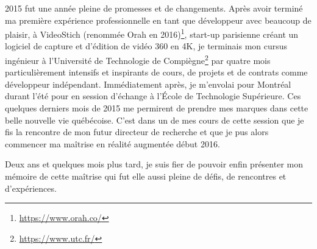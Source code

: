 2015 fut une année pleine de promesses et de changements. Après avoir terminé ma première expérience professionnelle en tant que développeur avec beaucoup de plaisir, à VideoStich (renommée Orah en 2016)\footnote{\url{https://www.orah.co/}}, start-up parisienne créant un logiciel de capture et d'édition de vidéo 360 en 4K, je terminais mon cursus ingénieur à l'Université de Technologie de Compiègne\footnote{\url{https://www.utc.fr/}} par quatre mois particulièrement intensifs et inspirants de cours, de projets et de contrats comme développeur indépendant. Immédiatement après, je m'envolai pour Montréal durant l'été pour en session d'échange à l'École de Technologie Supérieure. Ces quelques derniers mois de 2015 me permirent de prendre mes marques dans cette belle nouvelle vie québécoise. C'est dans un de mes cours de cette session que je fis la rencontre de mon futur directeur de recherche et que je pus alors commencer ma maîtrise en réalité augmentée début 2016.

Deux ans et quelques mois plus tard, je suis fier de pouvoir enfin présenter mon mémoire de cette maîtrise qui fut elle aussi pleine de défis, de rencontres et d'expériences.